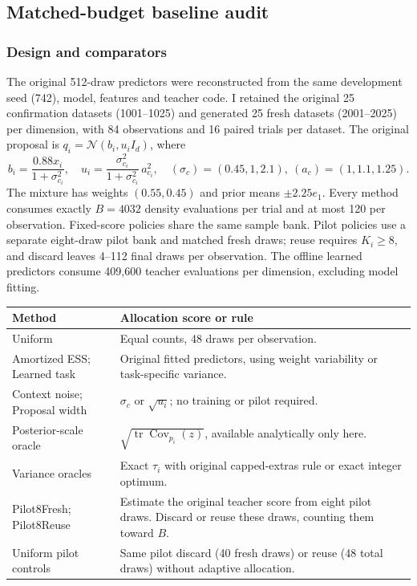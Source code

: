\documentclass[10pt,letterpaper]{article}
\newcommand{\N}{\mathcal N}
\begin{document}
\subsection{Matched-budget baseline audit}\label{sec:baselines}
\subsubsection{Design and comparators}
The original 512-draw predictors were reconstructed from the same development seed (742), model, features and teacher code. I retained the original 25 confirmation datasets (1001--1025) and generated 25 fresh datasets (2001--2025) per dimension, with 84 observations and 16 paired trials per dataset. The original proposal is $q_i=\N(b_i,u_i I_d)$, where
\begin{equation}
 b_i=\frac{0.88x_i}{1+\sigma_{c_i}^2},\quad
 u_i=\frac{\sigma_{c_i}^2}{1+\sigma_{c_i}^2}\,a_{c_i}^{2},\quad
 (\sigma_c)=(0.45,1,2.1),\ (a_c)=(1,1.1,1.25).
\end{equation}
The mixture has weights $(0.55,0.45)$ and prior means $\pm 2.25 e_1$. Every method consumes exactly $B=4032$ density evaluations per trial and at most 120 per observation. Fixed-score policies share the same sample bank. Pilot policies use a separate eight-draw pilot bank and matched fresh draws; reuse requires $K_i\geq8$, and discard leaves 4--112 final draws per observation. The offline learned predictors consume 409,600 teacher evaluations per dimension, excluding model fitting.

\begin{center}\begin{minipage}{\linewidth}\centering\small
\begin{tabularx}{\linewidth}{@{}lY@{}}
\toprule
Method & Allocation score or rule\\
\midrule
Uniform & Equal counts, 48 draws per observation.\\
Amortized ESS; Learned task & Original fitted predictors, using weight variability or task-specific variance.\\
Context noise; Proposal width & $\sigma_c$ or $\sqrt{u_i}$; no training or pilot required.\\
Posterior-scale oracle & $\sqrt{\operatorname{tr}\operatorname{Cov}_{p_i}(z)}$, available analytically only here.\\
Variance oracles & Exact $\tau_i$ with original capped-extras rule or exact integer optimum.\\
Pilot8Fresh; Pilot8Reuse & Estimate the original teacher score from eight pilot draws. Discard or reuse these draws, counting them toward $B$.\\
Uniform pilot controls & Same pilot discard (40 fresh draws) or reuse (48 total draws) without adaptive allocation.\\
\bottomrule
\end{tabularx}
\end{minipage}\end{center}
\end{document}
